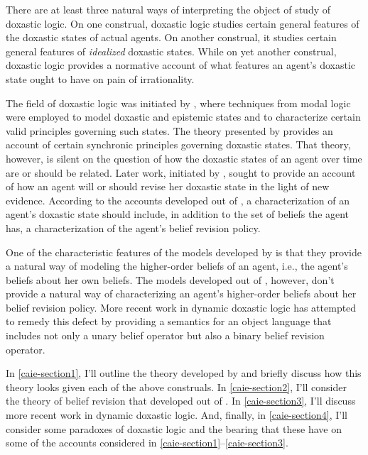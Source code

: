 There are at least three natural ways of interpreting the object of study of doxastic logic.
On one construal, doxastic logic studies certain general features of the doxastic states of actual agents. 
On another construal, it studies certain general features of \textit{idealized} doxastic states.
While on yet another construal, doxastic logic provides a normative account of what features an agent's doxastic state ought to have on pain of irrationality.

The field of doxastic logic was initiated by \citet{Hintikka1}, where techniques from modal logic were employed to model  doxastic and epistemic states and to characterize certain valid principles governing such states.
The theory presented by \citeauthor{Hintikka1} provides an account of certain synchronic principles governing doxastic states.
That theory, however, is silent on the question of how the doxastic states of an agent over time are or should be related.
Later work, initiated by \citet{AGM}, sought to provide an account of how an agent will or should revise her doxastic state in the light of new evidence.
According to the accounts developed out of \citeauthor{AGM}, a characterization of an agent's doxastic state should include, in addition to the set of beliefs the agent has, a characterization of the agent's belief revision policy. 

One of the characteristic features of the models developed by \citeauthor{Hintikka1} is that they provide a natural way of modeling the higher-order beliefs of an agent, i.e., the agent's beliefs about her own beliefs.
The models developed out of \citeauthor{AGM}, however, don't provide a natural way of characterizing an agent's higher-order beliefs about her belief revision policy.
More recent work in dynamic doxastic logic has attempted to remedy this defect by providing a semantics for an object language that includes not only a unary belief operator but also a binary belief revision operator.

In \autoref{caie-section1}, I'll outline the theory developed by \citeauthor{Hintikka1} and briefly discuss how this theory looks given each of the above construals.
In \autoref{caie-section2}, I'll consider the theory of belief revision that developed out of \citeauthor{AGM}.
In \autoref{caie-section3}, I'll discuss more recent work in dynamic doxastic logic.
And, finally, in \autoref{caie-section4}, I'll consider some paradoxes of doxastic logic and the bearing that these have on some of the accounts considered in \autoref{caie-section1}--\ref{caie-section3}.



